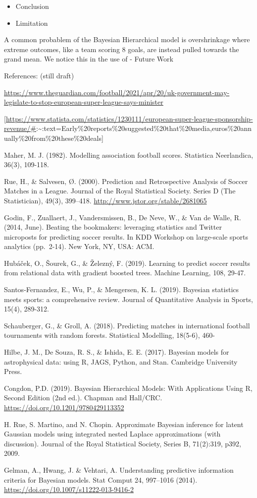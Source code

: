 \documentclass[
]{article}
\begin{document}
\begin{itemize}
\item
  Conclusion
\item
  Limitation
\end{itemize}

A common probablem of the Bayesian Hierarchical model is overshrinkage
where extreme outcomes, like a team scoring 8 goals, are instead pulled
towards the grand mean. We notice this in the use of - Future Work

References: (still draft)

\url{https://www.theguardian.com/football/2021/apr/20/uk-government-may-legislate-to-stop-european-super-league-says-minister}

{[}\url{https://www.statista.com/statistics/1230111/european-super-league-sponsorship-revenue/\#}:\textasciitilde:text=Early\%20reports\%20suggested\%20that\%20media,euros\%20annually\%20from\%20these\%20deals{]}

Maher, M. J. (1982). Modelling association football scores. Statistica
Neerlandica, 36(3), 109-118.

Rue, H., \& Salvesen, Ø. (2000). Prediction and Retrospective Analysis
of Soccer Matches in a League. Journal of the Royal Statistical Society.
Series D (The Statistician), 49(3), 399--418.
\url{http://www.jstor.org/stable/2681065}

Godin, F., Zuallaert, J., Vandersmissen, B., De Neve, W., \& Van de
Walle, R. (2014, June). Beating the bookmakers: leveraging statistics
and Twitter microposts for predicting soccer results. In KDD Workshop on
large-scale sports analytics (pp.~2-14). New York, NY, USA: ACM.

Hubáček, O., Šourek, G., \& Železný, F. (2019). Learning to predict
soccer results from relational data with gradient boosted trees. Machine
Learning, 108, 29-47.

Santos-Fernandez, E., Wu, P., \& Mengersen, K. L. (2019). Bayesian
statistics meets sports: a comprehensive review. Journal of Quantitative
Analysis in Sports, 15(4), 289-312.

Schauberger, G., \& Groll, A. (2018). Predicting matches in
international football tournaments with random forests. Statistical
Modelling, 18(5-6), 460-

Hilbe, J. M., De Souza, R. S., \& Ishida, E. E. (2017). Bayesian models
for astrophysical data: using R, JAGS, Python, and Stan. Cambridge
University Press.

Congdon, P.D. (2019). Bayesian Hierarchical Models: With Applications
Using R, Second Edition (2nd ed.). Chapman and Hall/CRC.
\url{https://doi.org/10.1201/9780429113352}

H. Rue, S. Martino, and N. Chopin. Approximate Bayesian inference for
latent Gaussian models using integrated nested Laplace approximations
(with discussion). Journal of the Royal Statistical Society, Series B,
71(2):319, p392, 2009.

Gelman, A., Hwang, J. \& Vehtari, A. Understanding predictive
information criteria for Bayesian models. Stat Comput 24, 997--1016
(2014). \url{https://doi.org/10.1007/s11222-013-9416-2}
\end{document}

